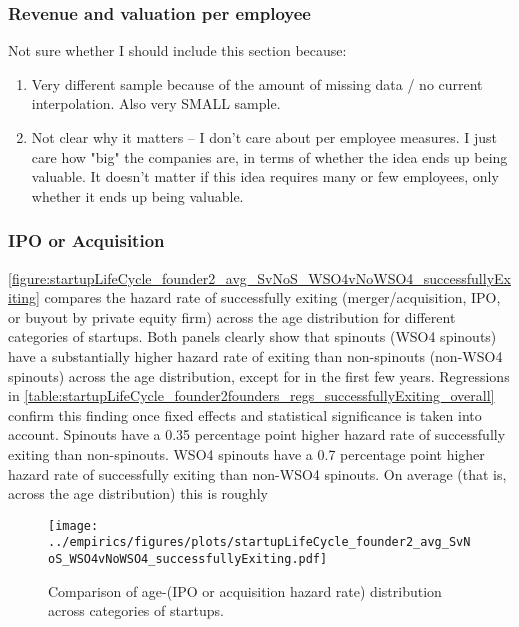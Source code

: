\documentclass[12pt,english]{article}
\theoremstyle{remark}
\begin{document}
\subsubsection{Revenue and valuation per employee}

Not sure whether I should include this section because:

\begin{enumerate}
	\item Very different sample because of the amount of missing data / no current interpolation. Also very SMALL sample.
	\item Not clear why it matters -- I don't care about per employee measures. I just care how "big" the companies are, in terms of whether the idea ends up being valuable. It doesn't matter if this idea requires many or few employees, only whether it ends up being valuable. 
\end{enumerate}

\subsubsection{IPO or Acquisition}

\autoref{figure:startupLifeCycle_founder2_avg_SvNoS_WSO4vNoWSO4_successfullyExiting} compares the hazard rate of successfully exiting (merger/acquisition, IPO, or buyout by private equity firm) across the age distribution for different categories of startups. Both panels clearly show that spinouts (WSO4 spinouts) have a substantially higher hazard rate of exiting than non-spinouts (non-WSO4 spinouts) across the age distribution, except for in the first few years. Regressions in \autoref{table:startupLifeCycle_founder2founders_regs_successfullyExiting_overall} confirm this finding once fixed effects and statistical significance is taken into account. Spinouts have a 0.35 percentage point higher hazard rate of successfully exiting than non-spinouts. WSO4 spinouts have a 0.7 percentage point higher hazard rate of successfully exiting than non-WSO4 spinouts. On average (that is, across the age distribution) this is roughly 

\begin{figure}[]
	\centering
	\texttt{[image: ../empirics/figures/plots/startupLifeCycle\_founder2\_avg\_SvNoS\_WSO4vNoWSO4\_successfullyExiting.pdf]}
	\caption{Comparison of age-(IPO or acquisition hazard rate) distribution across categories of startups.}
	\label{figure:startupLifeCycle_founder2_avg_SvNoS_WSO4vNoWSO4_successfullyExiting}
\end{figure}
\end{document}
